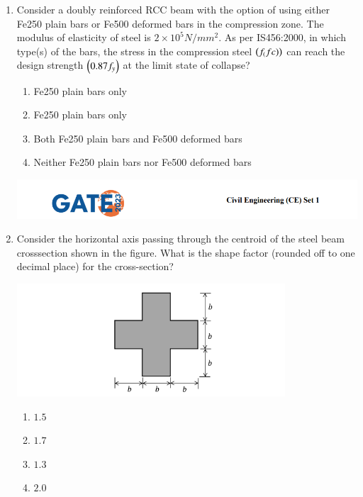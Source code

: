 \documentclass[journal,14pt,onecolumn]{IEEEtran}
\theoremstyle{remark}
\begin{document}
\begin{enumerate}[label={Q\arabic*.}]
\item Consider a doubly reinforced RCC beam with the option of using either Fe250 plain bars or Fe500 deformed bars in the compression zone. The modulus of elasticity of steel is $2 \times 10^5 N/mm^2$. As per IS456:2000, in which type(s) of the bars, the stress in the compression steel $\left(f_(fc)\right)$ can reach the design strength $\left(0.87f_y\right)$ at the limit state of collapse?
\begin{enumerate}
    \item Fe250 plain bars only
    \item Fe250 plain bars only
    \item Both Fe250 plain bars and Fe500 deformed bars
    \item Neither Fe250 plain bars nor Fe500 deformed bars
\end{enumerate}

\newpage

\includegraphics[width=\textwidth]{pics/header.png}
\item Consider the horizontal axis passing through the centroid of the steel beam crosssection shown in the figure. What is the shape factor (rounded off to one decimal place) for the cross-section?
\begin{center}
    \includegraphics[width=10cm]{pics/Screenshot 2025-08-05 205813.png}
\end{center}
\begin{enumerate}
    \item $1.5$
    \item $1.7$
    \item $1.3$
    \item $2.0$
\end{enumerate}
\vspace{1cm}


\end{enumerate}
\end{document}
